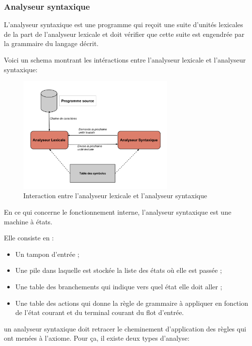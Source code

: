 \documentclass{article}
\begin{document}
\subsubsection{Analyseur syntaxique}

L'analyseur syntaxique est une programme qui reçoit une suite d'unités lexicales de la part de l'analyseur lexicale et doit vérifier que cette suite est engendrée par la grammaire du langage décrit.

Voici un schema montrant les intéractions entre l'analyseur lexicale et l'analyseur syntaxique:

\begin{figure}[h]
	\centering
		\includegraphics[width=0.70\textwidth]{interactionLexSynt.png}
	\caption{Interaction entre l'analyseur lexicale et l'analyseur syntaxique}
	\label{fig:interactionLexSynt}
\end{figure}\FloatBarrier

En ce qui concerne le fonctionnement interne, l'analyseur syntaxique est une machine à états. 

Elle consiste en :
\begin{itemize}
    \item Un tampon d'entrée ;
    \item Une pile dans laquelle est stockée la liste des états où elle est passée ;
    \item Une table des branchements qui indique vers quel état elle doit aller ;
    \item Une table des actions qui donne la règle de grammaire à appliquer en fonction de l'état courant et du terminal courant du flot d'entrée.
\end{itemize}

un analyseur syntaxique doit retracer le cheminement d’application des règles qui ont menées à l’axiome. Pour ça, il existe deux types d’analyse:
\end{document}
